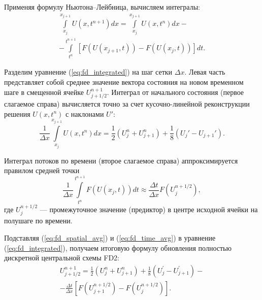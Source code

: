 \documentclass[a4paper,14pt]{extarticle}
\theoremstyle{theorem}
\theoremstyle{lemma}
\begin{document}
Применяя формулу Ньютона--Лейбница, вычисляем интегралы:
\begin{equation}
\label{eq:fd_integrated}
\begin{gathered}
    \int\limits_{x_j}^{x_{j+1}} U(x, t^{n+1}) dx = \int\limits_{x_j}^{x_{j+1}} U(x, t^n) dx - \\
    - \int\limits_{t^n}^{t^{n+1}} \left[ F(U(x_{j+1}, t)) - F(U(x_j, t)) \right] dt.
\end{gathered}
\end{equation}

Разделим уравнение (\ref{eq:fd_integrated}) на шаг сетки $\Delta x$. Левая часть представляет собой среднее значение вектора состояния на новом временном шаге в смещенной ячейке $U_{j+1/2}^{n+1}$. Интеграл от начального состояния (первое слагаемое справа) вычисляется точно за счет кусочно-линейной реконструкции решения $U(x, t^n)$ с наклонами $U'$:
\begin{equation}
\label{eq:fd_spatial_avg}
\frac{1}{\Delta x} \int\limits_{x_j}^{x_{j+1}} U(x, t^n) dx = \frac{1}{2} (U_j^n + U_{j+1}^n) + \frac{1}{8} (U_j' - U_{j+1}').
\end{equation}

Интеграл потоков по времени (второе слагаемое справа) аппроксимируется правилом средней точки
\begin{equation}
\label{eq:fd_time_avg}
\frac{1}{\Delta x} \int\limits_{t^n}^{t^{n+1}} F(U(x_j, t)) dt \approx \frac{\Delta t}{\Delta x} F\left( U_j^{n+1/2} \right),
\end{equation}
где $U_j^{n+1/2}$ — промежуточное значение (предиктор) в центре исходной ячейки на полушаге по времени.

Подставляя (\ref{eq:fd_spatial_avg}) и (\ref{eq:fd_time_avg}) в уравнение (\ref{eq:fd_integrated}), получаем итоговую формулу обновления полностью дискретной центральной схемы FD2:
\begin{equation}
\label{eq:fd2_final}
\begin{gathered}
U_{j+1/2}^{n+1} = \frac{1}{2} \left( U_j^n + U_{j+1}^n \right) + \frac{1}{8} \left( U_j^\prime - U_{j+1}^\prime \right) - \\
- \frac{\Delta t}{\Delta x} \left[ F\left( U_{j+1}^{n+1/2} \right) - F\left( U_j^{n+1/2} \right) \right].
\end{gathered}
\end{equation}

\end{document}
